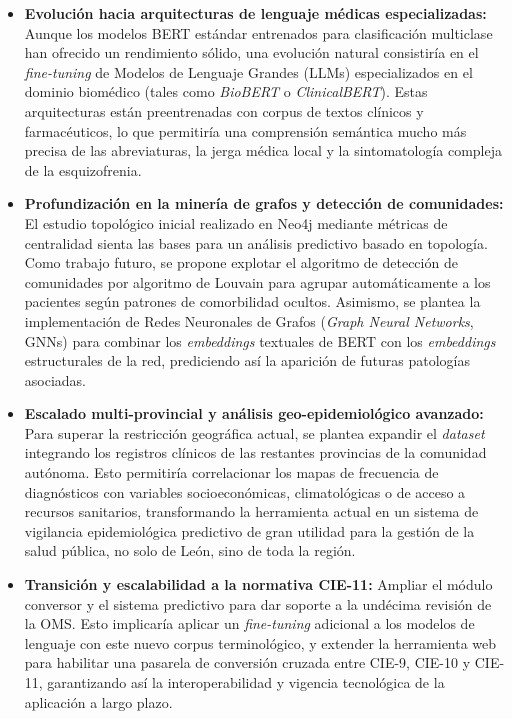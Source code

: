 \documentclass[12pt,a4paper,onecolumn,oneside]{report}
\begin{document}
\begin{itemize}
    \item \textbf{Evolución hacia arquitecturas de lenguaje médicas especializadas:} Aunque los modelos BERT estándar entrenados para clasificación multiclase han ofrecido un rendimiento sólido, una evolución natural consistiría en el \textit{fine-tuning} de Modelos de Lenguaje Grandes (LLMs) especializados en el dominio biomédico (tales como \textit{BioBERT} o \textit{ClinicalBERT}). Estas arquitecturas están preentrenadas con corpus de textos clínicos y farmacéuticos, lo que permitiría una comprensión semántica mucho más precisa de las abreviaturas, la jerga médica local y la sintomatología compleja de la esquizofrenia.
    
    \item \textbf{Profundización en la minería de grafos y detección de comunidades:} El estudio topológico inicial realizado en Neo4j mediante métricas de centralidad sienta las bases para un análisis predictivo basado en topología. Como trabajo futuro, se propone explotar el algoritmo de detección de comunidades por algoritmo de Louvain para agrupar automáticamente a los pacientes según patrones de comorbilidad ocultos. Asimismo, se plantea la implementación de Redes Neuronales de Grafos (\textit{Graph Neural Networks}, GNNs) para combinar los \textit{embeddings} textuales de BERT con los \textit{embeddings} estructurales de la red, prediciendo así la aparición de futuras patologías asociadas.
    
    \item \textbf{Escalado multi-provincial y análisis geo-epidemiológico avanzado:} Para superar la restricción geográfica actual, se plantea expandir el \textit{dataset} integrando los registros clínicos de las restantes provincias de la comunidad autónoma. Esto permitiría correlacionar los mapas de frecuencia de diagnósticos con variables socioeconómicas, climatológicas o de acceso a recursos sanitarios, transformando la herramienta actual en un sistema de vigilancia epidemiológica predictivo de gran utilidad para la gestión de la salud pública, no solo de León, sino de toda la región.
    
    \item \textbf{Transición y escalabilidad a la normativa CIE-11:} Ampliar el módulo conversor y el sistema predictivo para dar soporte a la undécima revisión de la OMS. Esto implicaría aplicar un \textit{fine-tuning} adicional a los modelos de lenguaje con este nuevo corpus terminológico, y extender la herramienta web para habilitar una pasarela de conversión cruzada entre CIE-9, CIE-10 y CIE-11, garantizando así la interoperabilidad y vigencia tecnológica de la aplicación a largo plazo.
    

\end{itemize}
\end{document}
